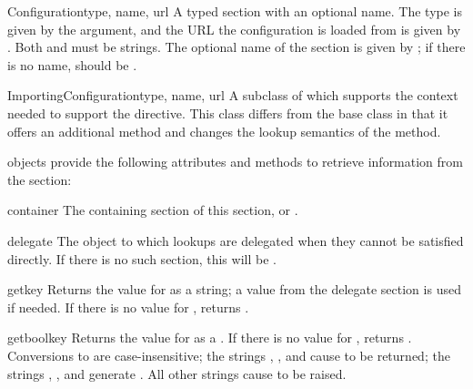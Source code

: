 \documentclass{howto}
\begin{document}
\begin{classdesc}{Configuration}{type, name, url}
  A typed section with an optional name.  The type is given by the
   argument, and the URL the configuration is loaded from is
  given by .  Both  and  must be strings.
  The optional name of the section is given by ; if there is
  no name,  should be .
\end{classdesc}

\begin{classdesc}{ImportingConfiguration}{type, name, url}
  A subclass of  which supports the context
  needed to support the  directive.  This class
  differs from the base class in that it offers an additional method
  and changes the lookup semantics of the  method.
\end{classdesc}

 objects provide the following attributes and
methods to retrieve information from the section:

\begin{memberdesc}[Configuration]{container}
  The containing section of this section, or .
\end{memberdesc}

\begin{memberdesc}[Configuration]{delegate}
  The  object to which lookups are delegated when
  they cannot be satisfied directly.  If there is no such section,
  this will be .
\end{memberdesc}

\begin{methoddesc}[Configuration]{get}{key}
  Returns the value for  as a string; a value from the
  delegate section is used if needed.  If there is no value for
  , returns .
\end{methoddesc}

\begin{methoddesc}[Configuration]{getbool}{key}
  Returns the value for  as a .  If there is no
  value for , returns .  Conversions to
   are case-insensitive; the strings ,
  , and  cause  to be returned; the
  strings , , and  generate
  .  All other strings cause  to be
  raised.
\end{methoddesc}
\end{document}
